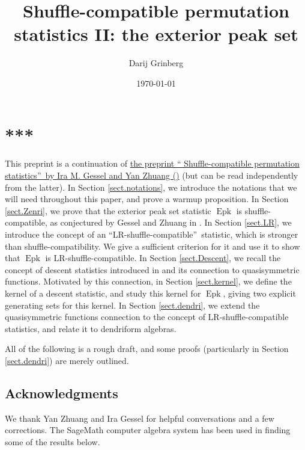 \documentclass[numbers=enddot,12pt,final,onecolumn,notitlepage]{scrartcl}%
\theoremstyle{definition}
\begin{document}
\title{Shuffle-compatible permutation statistics II: the exterior peak set}
\author{Darij Grinberg}
\date{\today}
\maketitle
\tableofcontents

\section*{***}

This preprint is a continuation of
\href{http://lanl.arxiv.org/abs/1706.00750v2}{the preprint \textquotedblleft
Shuffle-compatible permutation statistics\textquotedblright\ by Ira M. Gessel
and Yan Zhuang (\cite{part1})} (but can be read independently from the
latter). In Section \ref{sect.notations}, we introduce the notations that we
will need throughout this paper, and prove a warmup proposition. In Section
\ref{sect.Zenri}, we prove that the exterior peak set statistic
$\operatorname*{Epk}$ is shuffle-compatible, as conjectured by Gessel and
Zhuang in \cite{part1}. In Section \ref{sect.LR}, we introduce the concept of
an \textquotedblleft LR-shuffle-compatible\textquotedblright\ statistic, which
is stronger than shuffle-compatibility. We give a sufficient criterion for it
and use it to show that $\operatorname*{Epk}$ is LR-shuffle-compatible. In
Section \ref{sect.Descent}, we recall the concept of descent statistics
introduced in \cite{part1} and its connection to quasisymmetric functions.
Motivated by this connection, in Section \ref{sect.kernel}, we define the
kernel of a descent statistic, and study this kernel for $\operatorname*{Epk}%
$, giving two explicit generating sets for this kernel. In Section
\ref{sect.dendri}, we extend the quasisymmetric functions connection to the
concept of LR-shuffle-compatible statistics, and relate it to dendriform algebras.

All of the following is a rough draft, and some proofs (particularly in
Section \ref{sect.dendri}) are merely outlined.

\subsection*{Acknowledgments}

We thank Yan Zhuang and Ira Gessel for helpful conversations and a few
corrections. The SageMath computer algebra system \cite{SageMath} has been
used in finding some of the results below.
\end{document}
